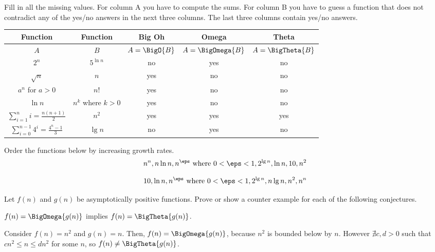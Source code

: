 \documentclass[12pt,letterpaper]{hmcpset}
\begin{document}
\begin{problem}[5]
Fill in all the missing values. For column A you have to compute the sums. For column B you have to guess a function that does not contradict any of the yes/no answers in the next three columns. The last three columns contain yes/no answers. 
\end{problem}

\begin{solution}
\begin{tabular}{|c|c|c|c|c|}
\hline  Function & Function  & Big Oh & Omega & Theta  \\ 
\hline $A$ & $B$  & $A = \BigO{B}$ & $A = \BigOmega{B}$  & $A = \BigTheta{B}$  \\ 
\hline  $2^n$ & $5^{\ln n}$ & no & yes & no \\ 
\hline $\sqrt{n}$ & $n$ & yes & no & no \\ 
\hline $a^n$ for $a > 0$ & $n!$  & yes & no & no \\ 
\hline $\ln n$ & $n^k$ where $k > 0$ & yes & no & no \\ 
\hline $\sum\limits_{i=1}^{n} i = \frac{n(n+1)}{2} $& $n^2$ & yes & yes & yes \\ 
\hline $\sum\limits_{i=0}^{n-1} 4^i = \frac{4^n -1}{3} $& $\lg n$ & no & yes & no \\ 
\hline 
\end{tabular}  
\end{solution}

\begin{problem}[6]
Order the functions below by increasing growth rates.
\[
n^n, n\ln n, n^\eps \text{ where } 0 < \eps < 1, 2^{\lg n}, \ln n, 10, n^2
\]
\end{problem}

\begin{solution}
\[10, \ln n, n^\eps \text{ where } 0 < \eps < 1, 2^{\lg n}, n\lg n, n^2, n^n\]
\end{solution}

\begin{problem}[7]
Let $f(n)$ and $g(n)$ be asymptotically positive functions. Prove or show a counter example for each of the following conjectures.
\end{problem}

\begin{problem}[7a]
$f(n) = \BigOmega{g(n)}$ implies $f(n) = \BigTheta{g(n)}$.
\end{problem}

\begin{solution}
Consider $f(n) = n^2$ and $g(n) = n$.  Then, $f(n) = \BigOmega{g(n)}$, because $n^2$ is bounded below by $n$.  However $\nexists c,d > 0$ such that $cn^2\leq n \leq dn^2$ for some $n$, so $f(n) \neq \BigTheta{g(n)}$.
\end{solution}
\end{document}
